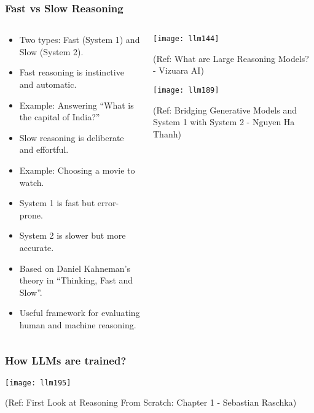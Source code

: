 \begin{frame}[fragile]\frametitle{Fast vs Slow Reasoning}

\begin{columns}
    \begin{column}[T]{0.6\linewidth}
		\begin{itemize}
		  \item Two types: Fast (System 1) and Slow (System 2).
		  \item Fast reasoning is instinctive and automatic.
		  \item Example: Answering ``What is the capital of India?''
		  \item Slow reasoning is deliberate and effortful.
		  \item Example: Choosing a movie to watch.
		  \item System 1 is fast but error-prone.
		  \item System 2 is slower but more accurate.
		  \item Based on Daniel Kahneman's theory in ``Thinking, Fast and Slow''.
		  \item Useful framework for evaluating human and machine reasoning.
		\end{itemize}

    \end{column}
    \begin{column}[T]{0.4\linewidth}
		\begin{center}
		\texttt{[image: llm144]}
		
		{\tiny (Ref: What are Large Reasoning Models? - Vizuara AI)}
		
		\texttt{[image: llm189]}
		
		{\tiny (Ref: Bridging Generative Models and System 1 with System 2 - Nguyen Ha Thanh)}
		
		\end{center}
    \end{column}
  \end{columns}
 
\end{frame}


\begin{frame}[fragile]\frametitle{How LLMs are trained?}

		\begin{center}
		\texttt{[image: llm195]}
		
		{\tiny (Ref: First Look at Reasoning From Scratch: Chapter 1 - Sebastian Raschka)}
	
		\end{center}

 
\end{frame}

